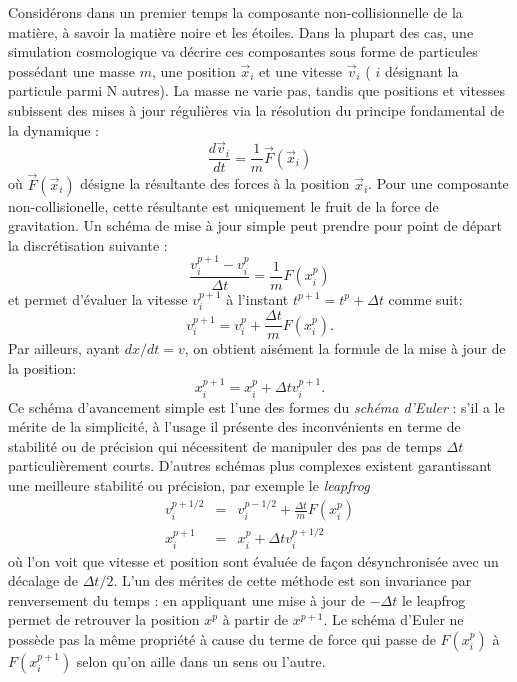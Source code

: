 Considérons dans un premier temps la composante non-collisionnelle de la matière, à savoir la matière noire et les étoiles. Dans la plupart des cas, une simulation cosmologique va décrire ces composantes sous forme de particules possédant une masse $m$, une position $\vec x_i$ et une vitesse $\vec v_i$ ( $i$ désignant la particule parmi N autres). La masse ne varie pas, tandis que positions et vitesses subissent des mises à jour régulières via la résolution du principe fondamental de la dynamique :
\begin{equation}
\frac{d \vec v_i}{dt}=\frac{1}{m} \vec{F}(\vec x_i)
\end{equation}
où $\vec{F}(\vec x_i)$ désigne la résultante des forces à la position $\vec x_i$. Pour une composante non-collisionelle, cette résultante est uniquement le fruit de la force de gravitation. Un schéma de mise à jour simple peut prendre pour point de départ la discrétisation suivante :
\begin{equation}
\frac{v_i^{p+1}-v_i^{p}}{\Delta t}=\frac{1}{m} {F}(x_i^p)
\end{equation}
et permet d'évaluer la vitesse $v_i^{p+1}$ à l'instant $t^{p+1}=t^p+\Delta t$ comme suit:
\begin{equation}
v_i^{p+1}=v_i^{p}+\frac{\Delta t}{m} {F}(x_i^p).
\end{equation}
Par ailleurs, ayant $dx/dt=v$, on obtient aisément la formule de la mise à jour de la position:
\begin{equation}
x^{p+1}_i=x^{p}_i+\Delta t v_i^{p+1}.
\end{equation}
Ce schéma d'avancement simple est l'une des formes du \textit{schéma d'Euler} : s'il a le mérite de la simplicité, à l'usage il présente des inconvénients en terme de stabilité ou de précision qui nécessitent de manipuler des pas de temps $\Delta t$ particulièrement courts. D'autres schémas plus complexes existent garantissant une meilleure stabilité ou précision, par exemple le \textit{leapfrog}
\begin{eqnarray}
v_i^{p+1/2}&=&v_i^{p-1/2}+\frac{\Delta t}{m} {F}(x_i^p)\\
x^{p+1}_i&=&x^{p}_i+\Delta t v_i^{p+1/2}
\end{eqnarray}
où l'on voit que vitesse et position sont évaluée de façon désynchronisée avec un décalage de $\Delta t/2$. L'un des mérites de cette méthode est son invariance par renversement du temps  : en appliquant une mise à jour de $-\Delta t$ le leapfrog permet de retrouver la position $x^p$ à partir de $x^{p+1}$. Le schéma d'Euler ne possède pas la même propriété à cause du terme de force qui passe de ${F}(x_i^p)$ à  ${F}(x_i^{p+1})$ selon qu'on aille dans un sens ou l'autre. 


